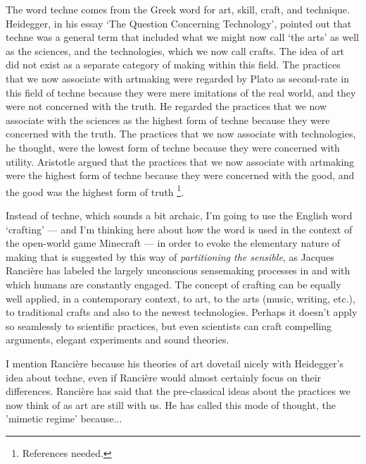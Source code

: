 \documentclass[letterpaper]{article}
\begin{document}
The word techne comes from the Greek word for art, skill, craft, and technique. Heidegger, in his essay ‘The Question Concerning Technology’, pointed out that techne was a general term that included what we might now call ‘the arts’ as well as the sciences, and the technologies, which we now call crafts. The idea of art did not exist as a separate category of making within this field. The practices that we now associate with artmaking were regarded by Plato as second-rate in this field of techne because they were mere imitations of the real world, and they were not concerned with the truth. He regarded the practices that we now associate with the sciences as the highest form of techne because they were concerned with the truth. The practices that we now associate with technologies, he thought, were the lowest form of techne because they were concerned with utility. Aristotle argued that the practices that we now associate with artmaking were the highest form of techne because they were concerned with the good, and the good was the highest form of truth \footnote{References needed.}.

Instead of techne, which sounds a bit archaic, I'm going to use the English word ‘crafting’ — and I'm thinking here about how the word is used in the context of the open-world game Minecraft — in order to evoke the elementary nature of making that is suggested by this way of \emph{partitioning the sensible}, as Jacques Rancière has labeled the largely unconscious sensemaking processes in and with which humans are constantly engaged. The concept of crafting can be equally well applied, in a contemporary context, to art, to the arts (music, writing, etc.), to traditional crafts and also to the newest technologies. Perhaps it doesn't apply so seamlessly to scientific practices, but even scientists can craft compelling arguments, elegant experiments and sound theories.

I mention Rancière because his theories of art dovetail nicely with Heidegger's idea about techne, even if Rancière would almost certainly focus on their differences. Rancière has said that the pre-classical ideas about the practices we now think of as art are still with us. He has called this mode of thought, the ’mimetic regime’ because...

\end{document}
